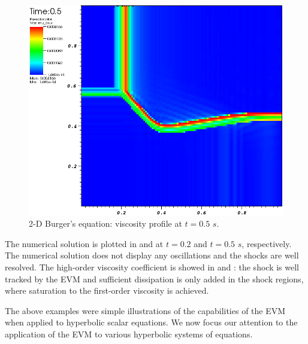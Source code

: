 %
\begin{figure}[H]
	\centering
	\includegraphics[width=\textwidth]{figures/Burger2D_visc_t0p5.png}
	\caption{2-D Burger's equation: viscosity profile at $t=0.5$ $s$.}
	\label{fig:2d_burger_visc_t0p5}
\end{figure}
%
The numerical solution is plotted in  and  at $t=0.2$ and $t=0.5$ $s$, respectively. The numerical solution does not display any oscillations and the shocks are well resolved. The high-order viscosity coefficient is showed in  and : the shock is well tracked by the EVM and sufficient dissipation is only added in the shock regions, where saturation to the first-order viscosity is achieved.

The above examples were simple illustrations of the capabilities of the EVM when applied to hyperbolic scalar equations. We now focus our attention to the application of the EVM to various hyperbolic systems of equations.